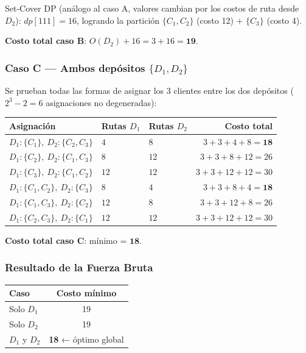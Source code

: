 \documentclass[12pt,a4paper]{article}
\begin{document}
Set-Cover DP (análogo al caso A, valores cambian por los costos de ruta desde $D_2$):
$dp[111]=16$, logrando la partición $\{C_1,C_2\}$ (costo 12) $+$ $\{C_3\}$ (costo 4).

\textbf{Costo total caso B}: $O(D_2) + 16 = 3 + 16 = \mathbf{19}$.

\subsubsection*{Caso C — Ambos depósitos $\{D_1, D_2\}$}

Se prueban todas las formas de asignar los 3 clientes entre los dos depósitos ($2^3-2=6$ asignaciones no degeneradas):

\begin{center}
\begin{tabular}{lllr}
\toprule
Asignación & Rutas $D_1$  & Rutas $D_2$  & Costo total \\
\midrule
$D_1:\{C_1\},\ D_2:\{C_2,C_3\}$       & $4$  & $8$  & $3+3+4+8=\mathbf{18}$ \\
$D_1:\{C_2\},\ D_2:\{C_1,C_3\}$       & $8$  & $12$ & $3+3+8+12=26$        \\
$D_1:\{C_3\},\ D_2:\{C_1,C_2\}$       & $12$ & $12$ & $3+3+12+12=30$       \\
$D_1:\{C_1,C_2\},\ D_2:\{C_3\}$       & $8$  & $4$  & $3+3+8+4=\mathbf{18}$\\
$D_1:\{C_1,C_3\},\ D_2:\{C_2\}$       & $12$ & $8$  & $3+3+12+8=26$        \\
$D_1:\{C_2,C_3\},\ D_2:\{C_1\}$       & $12$ & $12$ & $3+3+12+12=30$       \\
\bottomrule
\end{tabular}
\end{center}

\textbf{Costo total caso C}: mínimo = $\mathbf{18}$.

\subsubsection*{Resultado de la Fuerza Bruta}

\begin{center}
\begin{tabular}{lc}
\toprule
Caso & Costo mínimo \\
\midrule
Solo $D_1$       & 19 \\
Solo $D_2$       & 19 \\
$D_1$ y $D_2$    & \textbf{18} ← óptimo global \\
\bottomrule
\end{tabular}
\end{center}
\end{document}
